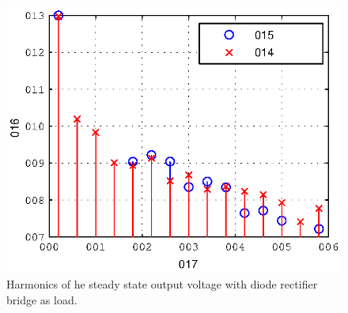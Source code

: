 \documentclass[conference,10pt]{IEEEtran}
\begin{document}
\begin{figure}[!h]
\centering

\includegraphics{fig/steady_state_harmonics}
\caption{Harmonics of he steady state output voltage with diode rectifier bridge as load.}
\label{fig:ss_harm}
\end{figure}



\end{document}
